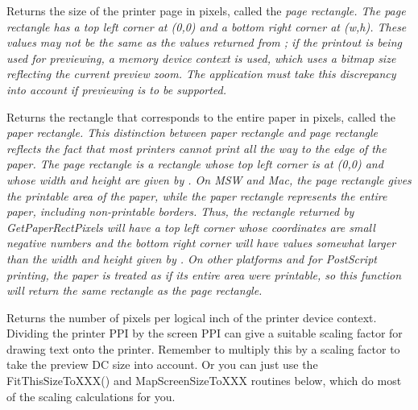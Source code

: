 Returns the size of the printer page in pixels, called the \em{page rectangle}.
The page rectangle has a top left corner at (0,0) and a bottom right corner at
(w,h). These values may not be the same as the values returned from
; if the printout is being used for
previewing, a memory device context is used, which uses a bitmap size reflecting
the current preview zoom. The application must take this discrepancy into
account if previewing is to be supported.




\label{wxprintoutgetpaperrectpixels}


Returns the rectangle that corresponds to the entire paper in pixels, called the
\em{paper rectangle}. This distinction between paper rectangle and page
rectangle reflects the fact that most printers cannot print all the way to the
edge of the paper. The page rectangle is a rectangle whose top left corner is at
(0,0) and whose width and height are given by
. On MSW and Mac,
the page rectangle gives the printable area of the paper, while the paper
rectangle represents the entire paper, including non-printable borders. Thus,
the rectangle returned by GetPaperRectPixels will have a top left corner whose
coordinates are small negative numbers and the bottom right corner will have
values somewhat larger than the width and height given by
. On other
platforms and for PostScript printing, the paper is treated as if its entire
area were printable, so this function will return the same rectangle as the page
rectangle.


\label{wxprintoutgetppiprinter}


Returns the number of pixels per logical inch of the printer device context.
Dividing the printer PPI by the screen PPI can give a suitable scaling factor
for drawing text onto the printer. Remember to multiply this by a scaling factor
to take the preview DC size into account. Or you can just use the
FitThisSizeToXXX() and MapScreenSizeToXXX routines below, which do most of the
scaling calculations for you.

